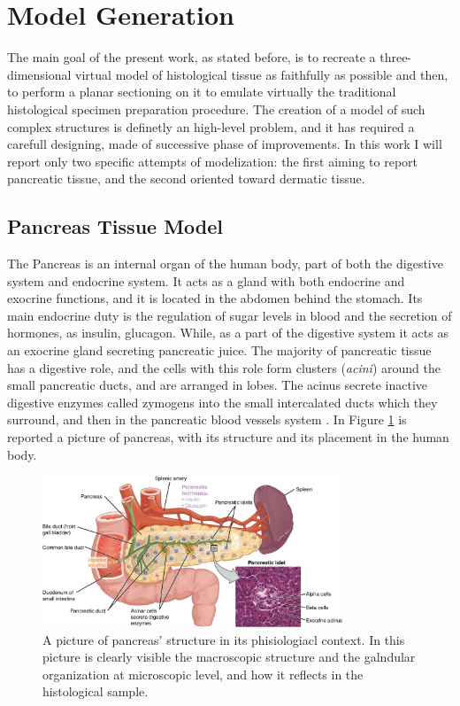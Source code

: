 \section{Model Generation}
The main goal of the present work, as stated before, is to recreate a three-dimensional virtual model of histological tissue as faithfully as possible and then, to perform a planar sectioning on it to emulate virtually the traditional histological specimen preparation procedure. The creation of a model of such complex structures is definetly an high-level problem, and it has required a carefull designing, made of successive phase of improvements. In this work I will report only two specific attempts of modelization: the first aiming to report pancreatic tissue, and the second oriented toward dermatic tissue.

\subsection{Pancreas Tissue Model} \label{ssec:panc_tis_mod}
The Pancreas is an internal organ of the human body, part of both the digestive system and endocrine system. It acts as a gland with both endocrine and exocrine functions, and it is located in the abdomen behind the stomach. Its main endocrine duty is the regulation of sugar levels in blood and the secretion of hormones, as insulin, glucagon. While, as a part of the digestive system it acts as an exocrine gland secreting pancreatic juice. The majority of pancreatic tissue has a digestive role, and the cells with this role form clusters (\textit{acini}) around the small pancreatic ducts, and are arranged in lobes. The acinus secrete inactive digestive enzymes called zymogens into the small intercalated ducts which they surround, and then in the pancreatic blood vessels system \cite{Pancreas}. In Figure \ref{fig:panc_struct} is reported a picture of pancreas, with its structure and its placement in the human body.

\begin{figure}
    \centering
    \includegraphics[width = 0.8\textwidth]{images/panc_struct}
    \caption{A picture of pancreas' structure in its phisiologiacl context. In this picture is clearly visible the macroscopic structure and the galndular organization at microscopic level, and how it reflects in the histological sample.}
    \label{fig:panc_struct}
\end{figure}

